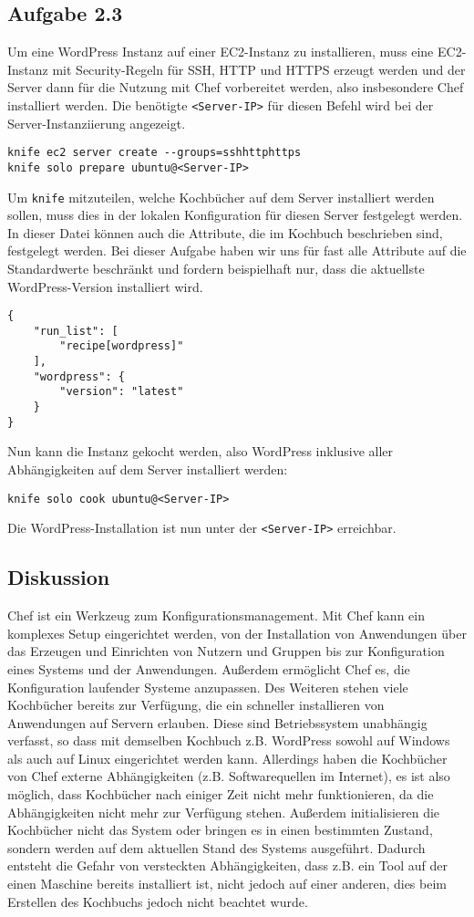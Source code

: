 \documentclass[a4paper]{scrartcl}
\begin{document}
\subsection*{Aufgabe 2.3}
Um eine WordPress Instanz auf einer EC2-Instanz zu installieren, muss eine EC2-Instanz mit Security-Regeln für SSH, HTTP und HTTPS erzeugt werden und der Server dann für die Nutzung mit Chef vorbereitet werden, also insbesondere Chef installiert werden. Die benötigte \verb|<Server-IP>| für diesen Befehl wird bei der Server-Instanziierung angezeigt.
\begin{verbatim}
knife ec2 server create --groups=sshhttphttps
knife solo prepare ubuntu@<Server-IP>
\end{verbatim}
Um \verb|knife| mitzuteilen, welche Kochbücher auf dem Server installiert werden sollen, muss dies in der lokalen Konfiguration für diesen Server festgelegt werden. In dieser Datei können auch die Attribute, die im Kochbuch beschrieben sind, festgelegt werden. Bei dieser Aufgabe haben wir uns für fast alle Attribute auf die Standardwerte beschränkt und fordern beispielhaft nur, dass die aktuellste WordPress-Version installiert wird.
\begin{lstlisting}
{
    "run_list": [
        "recipe[wordpress]"
    ],
    "wordpress": {    
        "version": "latest"
    }
}
\end{lstlisting}
Nun kann die Instanz gekocht werden, also WordPress inklusive aller Abhängigkeiten auf dem Server installiert werden:
\begin{verbatim}
knife solo cook ubuntu@<Server-IP>
\end{verbatim}
Die WordPress-Installation ist nun unter der \verb|<Server-IP>| erreichbar.
\subsection*{Diskussion}
Chef ist ein Werkzeug zum Konfigurationsmanagement. Mit Chef kann ein komplexes Setup eingerichtet werden, von der Installation von Anwendungen über das Erzeugen und Einrichten von Nutzern und Gruppen bis zur Konfiguration eines Systems und der Anwendungen. Außerdem ermöglicht Chef es, die Konfiguration laufender Systeme anzupassen. Des Weiteren stehen viele Kochbücher bereits zur Verfügung, die ein schneller installieren von Anwendungen auf Servern erlauben. Diese sind Betriebssystem unabhängig verfasst, so dass mit demselben Kochbuch z.B. WordPress sowohl auf Windows als auch auf Linux eingerichtet werden kann.
Allerdings haben die Kochbücher von Chef externe Abhängigkeiten (z.B. Softwarequellen im Internet), es ist also möglich, dass Kochbücher nach einiger Zeit nicht mehr funktionieren, da die Abhängigkeiten nicht mehr zur Verfügung stehen. Außerdem initialisieren die Kochbücher nicht das System oder bringen es in einen bestimmten Zustand, sondern werden auf dem aktuellen Stand des Systems ausgeführt. Dadurch entsteht die Gefahr von versteckten Abhängigkeiten, dass z.B. ein Tool auf der einen Maschine bereits installiert ist, nicht jedoch auf einer anderen, dies beim Erstellen des Kochbuchs jedoch nicht beachtet wurde.
\end{document}
